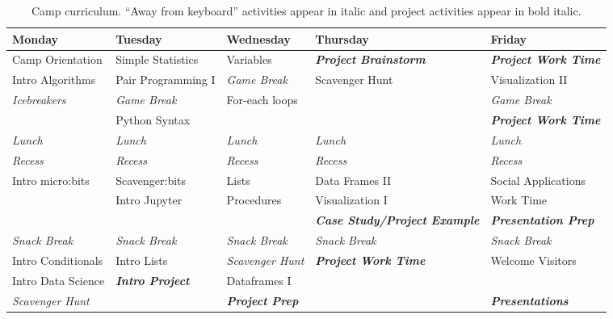 \newcommand{\afk}[1]{\textit{#1}}
\newcommand{\proj}[1]{\textit{\textbf{#1}}}

\begin{table*}[t]
\centering
\begin{tabular}{|l|l|l|l|l|}
\hline
\textbf{Monday} 	& \textbf{Tuesday} 	& \textbf{Wednesday} 	& \textbf{Thursday} 		& \textbf{Friday} \\ \hline
Camp Orientation 	& Simple Statistics	& Variables		& \proj{Project Brainstorm}	& \proj{Project Work Time} \\ \hline
Intro Algorithms	& Pair Programming I	& \afk{Game Break}	& Scavenger Hunt		& Visualization II \\ \hline
\afk{Icebreakers}      	& \afk{Game Break}	& For-each loops	& 				& \afk{Game Break} \\ \hline
                  	& Python Syntax		&			&				& \proj{Project Work Time} \\ \hline
\afk{Lunch} & \afk{Lunch}	& \afk{Lunch}	& \afk{Lunch}	& \afk{Lunch} \\ \hline
\afk{Recess} & \afk{Recess}	& \afk{Recess}	& \afk{Recess}	& \afk{Recess} \\ \hline
Intro micro:bits	& Scavenger:bits	& Lists 		& Data Frames II	 	& Social Applications \\ \hline
			& Intro Jupyter 	& Procedures		& Visualization I	 	& Work Time \\ \hline
			& 			& 			& \proj{Case Study/Project Example}	& \proj{Presentation Prep} \\ \hline
\afk{Snack Break} 	& \afk{Snack Break}	& \afk{Snack Break}	& \afk{Snack Break}	& \afk{Snack Break} \\ \hline
Intro Conditionals 	& Intro Lists		& \afk{Scavenger Hunt}	& \proj{Project Work Time}	& Welcome Visitors \\ \hline
Intro Data Science 	& \proj{Intro Project}	& Dataframes I		&				& \\ \hline
\afk{Scavenger Hunt}	&  			& \proj{Project Prep}	& 			& \proj{Presentations} \\ \hline
\end{tabular}
\caption{Camp curriculum.  ``Away from keyboard'' activities appear in italic and project activities appear in bold italic.}
\label{table:curriculum}
\end{table*}
